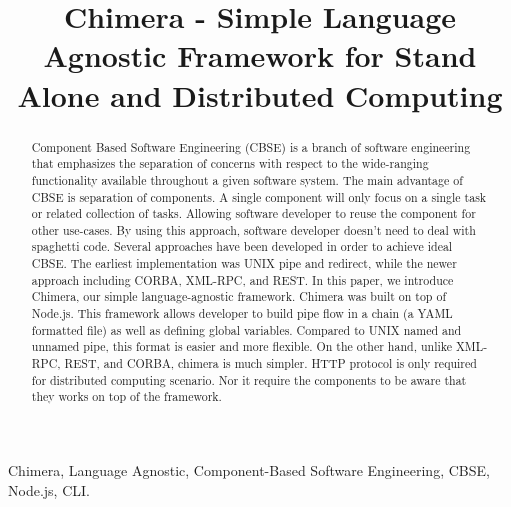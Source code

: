 \documentclass[conference]{IEEEtran}
\begin{document}
\title{Chimera - Simple Language Agnostic Framework for Stand Alone and Distributed Computing}

\author{
\and
{}
\and
{}
}

\maketitle


\begin{abstract}
Component Based Software Engineering (CBSE) is a branch of software 
engineering that emphasizes the separation of concerns with respect to the 
wide-ranging functionality available throughout a given software system.  The 
main advantage of CBSE is separation of components. A single component will 
only focus on a single task or related collection of tasks. Allowing software 
developer to reuse the component for other use-cases. By using this approach, 
software developer doesn't need to deal with spaghetti code. Several 
approaches have been developed in order to achieve ideal CBSE. The earliest 
implementation was UNIX pipe and redirect, while the newer approach including 
CORBA, XML-RPC, and REST. In this paper, we introduce Chimera, our simple 
language-agnostic framework. Chimera was built on top of Node.js. This framework
    allows developer to build pipe flow in a chain (a YAML formatted file) 
as well as defining global variables. Compared to UNIX named and unnamed pipe, 
this format is easier and more flexible. On the other hand, unlike XML-RPC, 
REST, and CORBA, chimera is much simpler. HTTP protocol is only required for
distributed computing scenario. Nor it require the components to be aware that 
they works on top of the framework.
\end{abstract}

\begin{IEEEkeywords}
Chimera, Language Agnostic, Component-Based Software Engineering, CBSE, Node.js, CLI.
\end{IEEEkeywords}
\end{document}
